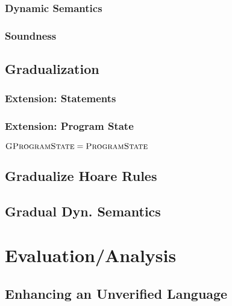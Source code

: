     \subsection{Dynamic Semantics}
    \label{ssec:dynamic-semantics}
    
    
    \subsection{Soundness}

\section{Gradualization}
\label{sec:cs-gradual-formulas}


    \subsection{Extension: Statements}
    \label{ssec:extension--statements}
    

    \subsection{Extension: Program State}
    $\textup{\textsc{GProgramState}} = \textup{\textsc{ProgramState}}$

\section{Gradualize Hoare Rules}
\label{sec:gradualize-hoare-rules}


\section{Gradual Dyn. Semantics}



\chapter{Evaluation/Analysis}
\label{ch:evaluation-analysis}


\section{Enhancing an Unverified Language}
\label{sec:enhancing-an-unverified}



